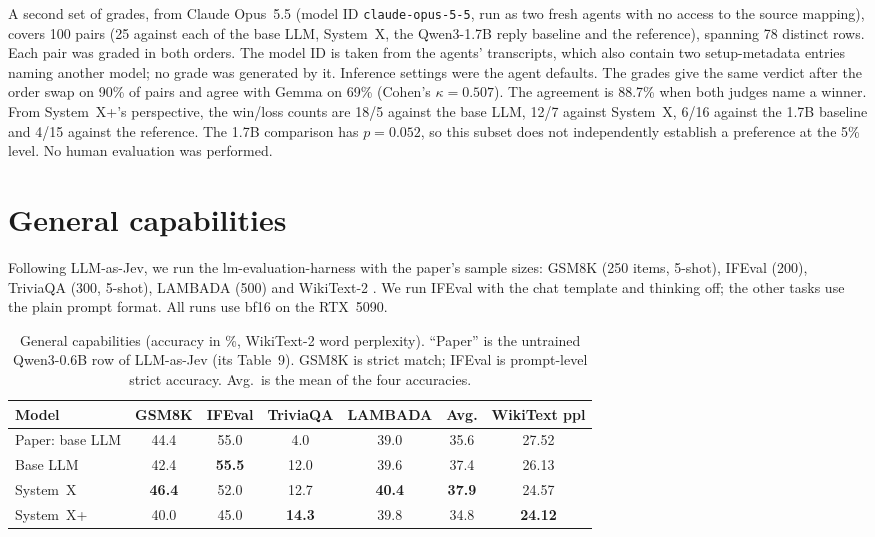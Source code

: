 \documentclass[11pt]{article}
\newcommand{\sysplus}{System~X+}
\begin{document}
A second set of grades, from Claude Opus~5.5 (model ID \texttt{claude-opus-5-5}, run as two fresh agents with no access to the source mapping), covers 100 pairs (25 against each of the base LLM, System~X, the Qwen3-1.7B reply baseline and the reference), spanning 78 distinct rows. Each pair was graded in both orders. The model ID is taken from the agents' transcripts, which also contain two setup-metadata entries naming another model; no grade was generated by it. Inference settings were the agent defaults. The grades give the same verdict after the order swap on 90\% of pairs and agree with Gemma on 69\% (Cohen's $\kappa=0.507$). The agreement is 88.7\% when both judges name a winner. From \sysplus{}'s perspective, the win/loss counts are 18/5 against the base LLM, 12/7 against System~X, 6/16 against the 1.7B baseline and 4/15 against the reference. The 1.7B comparison has $p=0.052$, so this subset does not independently establish a preference at the 5\% level. No human evaluation was performed.

\section{General capabilities}\label{sec:general}

Following LLM-as-Jev, we run the lm-evaluation-harness \citep{biderman2024lmeval} with the paper's sample sizes: GSM8K \citep{cobbe2021gsm8k} (250 items, 5-shot), IFEval \citep{zhou2023ifeval} (200), TriviaQA \citep{joshi2017triviaqa} (300, 5-shot), LAMBADA \citep{paperno2016lambada} (500) and WikiText-2 \citep{merity2017wikitext}. We run IFEval with the chat template and thinking off; the other tasks use the plain prompt format. All runs use bf16 on the RTX~5090.

\begin{table}[t]
\centering
\caption{General capabilities (accuracy in \%, WikiText-2 word perplexity). ``Paper'' is the untrained Qwen3-0.6B row of LLM-as-Jev (its Table~9). GSM8K is strict match; IFEval is prompt-level strict accuracy. Avg.\ is the mean of the four accuracies.}
\label{tab:general}
\small
\begin{tabular}{lccccc|c}
\toprule
Model & GSM8K & IFEval & TriviaQA & LAMBADA & Avg. & WikiText ppl \\
\midrule
Paper: base LLM & 44.4 & 55.0 & 4.0 & 39.0 & 35.6 & 27.52 \\
\midrule
Base LLM & 42.4 & \textbf{55.5} & 12.0 & 39.6 & 37.4 & 26.13 \\
System~X & \textbf{46.4} & 52.0 & 12.7 & \textbf{40.4} & \textbf{37.9} & 24.57 \\
\sysplus{} & 40.0 & 45.0 & \textbf{14.3} & 39.8 & 34.8 & \textbf{24.12} \\
\bottomrule
\end{tabular}
\end{table}
\end{document}
